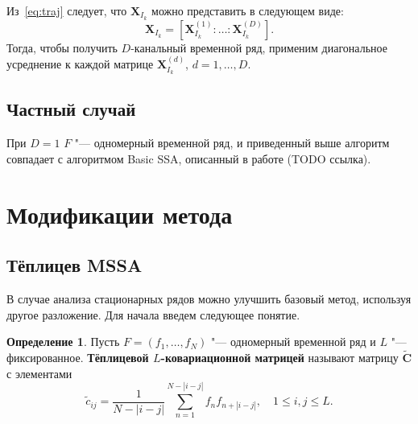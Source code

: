 \documentclass[specialist,
substylefile = spbu_report.rtx,
subf,href,colorlinks=true, 12pt]{disser}
\newcommand{\traj}{\mathbf{X}}
\newcommand{\toeplitz}{\widetilde{\mathbf{C}}}
\theoremstyle{definition}
\newtheorem{definition}{Определение}
\begin{document}
	Из~\eqref{eq:traj} следует, что $\traj_{I_k}$ можно представить в следующем виде:
	\[
	\traj_{I_k}=[\traj^{(1)}_{I_k}:\ldots:\traj^{(D)}_{I_k}].
	\]
	Тогда, чтобы получить $D$-канальный временной ряд, применим диагональное усреднение к каждой матрице $\traj_{I_k}^{(d)}$, $d=1,\ldots,D$.
	\subsection{Частный случай}
	При $D=1$ $F$ "--- одномерный временной ряд, и приведенный выше алгоритм совпадает с алгоритмом Basic SSA, описанный в работе (TODO ссылка).
	
	\section{Модификации метода}
	\subsection{Тёплицев MSSA}\label{toeplitz}
	В случае анализа стационарных рядов можно улучшить базовый метод, используя другое разложение. Для начала введем следующее понятие.
	
	\begin{definition}
	Пусть $F=(f_1,\ldots,f_N)$ "--- одномерный временной ряд и $L$ "--- фиксированное. \textbf{Тёплицевой $L$-ковариационной матрицей} называют матрицу $\toeplitz$ с элементами
	\[
	\widetilde{c}_{ij}=\frac{1}{N-|i-j|}\sum_{n=1}^{N-|i-j|} f_nf_{n+|i-j|},\quad 1\leqslant i,j \leqslant L.
	\]
	\end{definition}
	
\end{document}
